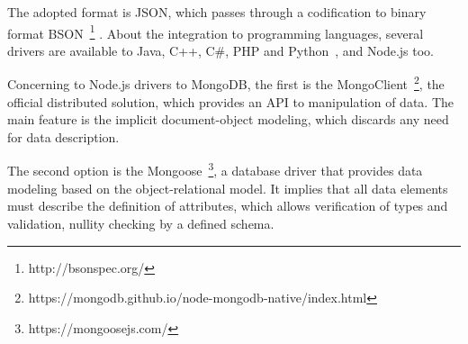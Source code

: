 \documentclass{svproc}
\begin{document}

The adopted format is JSON, which passes through a codification to binary format BSON~\footnote{http://bsonspec.org/}
. About the integration to programming languages, several drivers are available to Java, C++, C\#, PHP and Python~\cite{lutu2015big}, and Node.js too.


Concerning to Node.js drivers to MongoDB, the first is the MongoClient~\footnote{https://mongodb.github.io/node-mongodb-native/index.html}, the official distributed solution, which provides an API to manipulation of data. The main feature is the implicit document-object modeling, which discards any need for data description.


The second option is the Mongoose~\footnote{https://mongoosejs.com/}, a database driver that provides data modeling based on the object-relational model. It implies that all data elements must describe the definition of attributes, which allows verification of types and validation, nullity checking by a defined schema.

\end{document}
